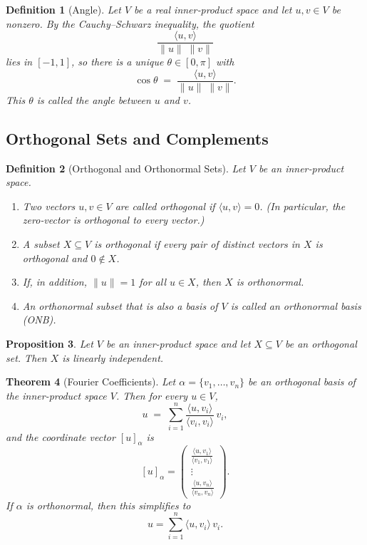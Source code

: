 \documentclass[12pt]{article}
\theoremstyle{break}             %
\newtheorem{thm}{Theorem}          %
\newtheorem{prop}[thm]{Proposition}%
\newtheorem{defn}[thm]{Definition}
\begin{document}
\begin{defn}[Angle]
Let \(V\) be a real inner‐product space and let \(u,v\in V\) be nonzero.  By the Cauchy–Schwarz inequality, the quotient
\[
\frac{\langle u,v\rangle}{\|u\|\;\|v\|}
\]
lies in \([-1,1]\), so there is a unique \(\theta\in[0,\pi]\) with
\[
\cos\theta
\;=\;
\frac{\langle u,v\rangle}{\|u\|\;\|v\|}.
\]
This \(\theta\) is called the \emph{angle} between \(u\) and \(v\).
\end{defn}

\subsection{Orthogonal Sets and Complements}

\begin{defn}[Orthogonal and Orthonormal Sets]
Let \(V\) be an inner‐product space.
\begin{enumerate}
  \item Two vectors \(u,v\in V\) are called \emph{orthogonal} if \(\langle u,v\rangle=0\).  (In particular, the zero‐vector is orthogonal to every vector.)
  \item A subset \(X\subseteq V\) is \emph{orthogonal} if every pair of distinct vectors in \(X\) is orthogonal and \(0\notin X\).
  \item If, in addition, \(\|u\|=1\) for all \(u\in X\), then \(X\) is \emph{orthonormal}.
  \item An orthonormal subset that is also a basis of \(V\) is called an \emph{orthonormal basis} (ONB).
\end{enumerate}
\end{defn}

\begin{prop}
Let \(V\) be an inner-product space and let \(X\subseteq V\) be an orthogonal set.  Then \(X\) is linearly independent.
\end{prop}

\begin{thm}[Fourier Coefficients]
Let \(\alpha=\{v_1,\dots,v_n\}\) be an orthogonal basis of the inner-product space \(V\).  Then for every \(u\in V\),
\[
u \;=\; \sum_{i=1}^n \frac{\langle u,v_i\rangle}{\langle v_i,v_i\rangle}\,v_i,
\]
and the coordinate vector \([u]_\alpha\) is
\[
[u]_\alpha
=
\begin{pmatrix}
\displaystyle\frac{\langle u,v_1\rangle}{\langle v_1,v_1\rangle}\\[6pt]
\vdots\\[3pt]
\displaystyle\frac{\langle u,v_n\rangle}{\langle v_n,v_n\rangle}
\end{pmatrix}.
\]
If \(\alpha\) is orthonormal, then this simplifies to
\[
u = \sum_{i=1}^n \langle u,v_i\rangle\,v_i.
\]
\end{thm}
\end{document}
